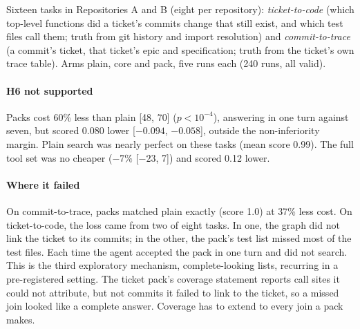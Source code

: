 Sixteen tasks in Repositories A and B (eight per repository): \emph{ticket-to-code} (which top-level functions did a
ticket's commits change that still exist, and which test files call them; truth from git history and import
resolution) and \emph{commit-to-trace} (a commit's ticket, that ticket's epic and specification; truth from the
ticket's own trace table). Arms plain, core and pack, five runs each (240 runs, all valid).

\paragraph{H6 not supported} Packs cost 60\% less than plain [48, 70] ($p<10^{-4}$), answering in one turn against
seven, but scored 0.080 lower [$-0.094$, $-0.058$], outside the non-inferiority margin. Plain search was nearly perfect
on these tasks (mean score 0.99). The full tool set was no cheaper ($-7\%$ [$-23$, 7]) and scored 0.12 lower.

\paragraph{Where it failed} On commit-to-trace, packs matched plain exactly (score 1.0) at 37\% less cost. On
ticket-to-code, the loss came from two of eight tasks. In one, the graph did not link the ticket to its commits; in
the other, the pack's test list missed most of the test files. Each time the agent accepted the pack in one turn and
did not search. This is the third exploratory mechanism, complete-looking lists, recurring in a pre-registered
setting. The ticket pack's coverage statement reports call sites it could not attribute, but not commits it failed
to link to the ticket, so a missed join looked like a complete answer. Coverage has to extend to every join a pack
makes.

